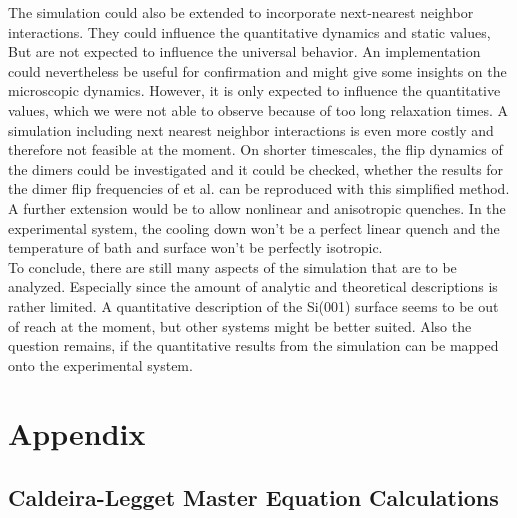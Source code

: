 	The simulation could also be extended to incorporate next-nearest neighbor interactions. They could influence the quantitative dynamics and static values, But are not expected to influence the universal behavior. An implementation could nevertheless be useful for confirmation and might give some insights on the microscopic dynamics. However, it is only expected to influence the quantitative values, which we were not able to observe because of too long relaxation times. A
	simulation including next nearest neighbor interactions is even more costly and therefore not feasible at the moment. On shorter timescales, the flip dynamics of the dimers could be investigated and it could be checked, whether the results for the dimer flip frequencies of \cite{fu2001molecular} et al. can be reproduced with this simplified method. A further extension would be to allow nonlinear and anisotropic quenches. In the experimental system, the cooling down won't be a perfect linear quench and the temperature of bath and surface won't be perfectly isotropic. \\
	
	To conclude, there are still many aspects of the simulation that are to be analyzed. Especially since the amount of analytic and theoretical descriptions is rather limited. A quantitative description of the Si(001) surface seems to be out of reach at the moment, but other systems might be better suited. Also the question remains, if the quantitative results from the simulation can be mapped onto the experimental system.
	
	\appendix
	\chapter{Appendix}
	\section{Caldeira-Legget Master Equation Calculations} \label{Section::Appendix-Caldeira-Legget}
